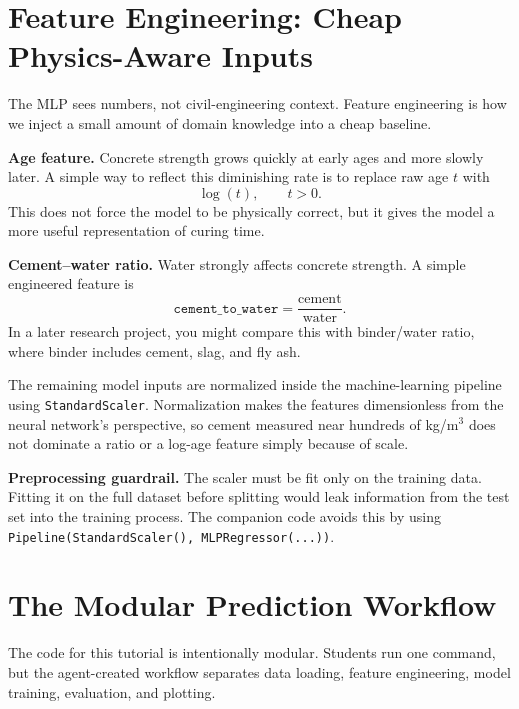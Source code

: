 \documentclass[11pt]{article}
\begin{document}
\section{Feature Engineering: Cheap Physics-Aware Inputs}
\label{sec:features}

The MLP sees numbers, not civil-engineering context.  Feature engineering is how we inject a small amount of domain knowledge into a cheap baseline.

\begin{def-box}
\textbf{Age feature.}  Concrete strength grows quickly at early ages and more slowly later.  A simple way to reflect this diminishing rate is to replace raw age $t$ with
\[
  \log(t), \qquad t > 0.
\]
This does not force the model to be physically correct, but it gives the model a more useful representation of curing time.
\end{def-box}

\begin{def-box}
\textbf{Cement--water ratio.}  Water strongly affects concrete strength.  A simple engineered feature is
\[
  \texttt{cement\_to\_water} = \frac{\text{cement}}{\text{water}}.
\]
In a later research project, you might compare this with binder/water ratio, where binder includes cement, slag, and fly ash.
\end{def-box}

The remaining model inputs are normalized inside the machine-learning pipeline using \texttt{StandardScaler}.  Normalization makes the features dimensionless from the neural network's perspective, so cement measured near hundreds of kg/m$^3$ does not dominate a ratio or a log-age feature simply because of scale.

\begin{alert-box}
\textbf{Preprocessing guardrail.}  The scaler must be fit only on the training data.  Fitting it on the full dataset before splitting would leak information from the test set into the training process.  The companion code avoids this by using \texttt{Pipeline(StandardScaler(), MLPRegressor(...))}.
\end{alert-box}

\section{The Modular Prediction Workflow}
\label{sec:workflow}

The code for this tutorial is intentionally modular.  Students run one command, but the agent-created workflow separates data loading, feature engineering, model training, evaluation, and plotting.
\end{document}
